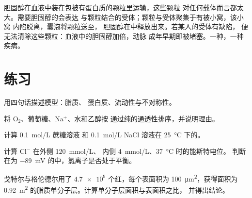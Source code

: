 \begin{example}[胆固醇的运送]\label{ex:b1:membranes-transport:ldl}
胆固醇在血液中装在包被有蛋白质的颗粒里运输，这些颗粒
对任何载体而言都太大。需要胆固醇的会表达
与颗粒结合的受体；颗粒与受体聚集于有被小窝，该小窝
内陷脱离，囊泡将颗粒送至，
胆固醇在中释放出来。若某人的受体有缺陷，
便无法清除这些颗粒：血液中的胆固醇加倍，动脉
成年早期即被堵塞。一种，一种疾病。
\end{example}

\section{练习}

\begin{exercise}[$\star$]\label{exo:b1:membranes-transport:1}
用四句话描述模型：脂质、
蛋白质、流动性与不对称性。
\end{exercise}

\begin{exercise}[$\star$]\label{exo:b1:membranes-transport:2}
将 $\mathrm{O_2}$、葡萄糖、$\mathrm{Na^+}$、水和乙醇按
通过纯的通透性排序，并说明理由。
\end{exercise}

\begin{exercise}[$\star$]\label{exo:b1:membranes-transport:3}
计算 \qty{0.1}{mol/L} 蔗糖溶液
和 \qty{0.1}{mol/L} NaCl 溶液在 \qty{25}{\celsius} 下的。
\end{exercise}

\begin{exercise}[$\star$]\label{exo:b1:membranes-transport:4}
计算 $\mathrm{Cl^-}$ 在外侧 \qty{120}{mmol/L}、
内侧 \qty{4}{mmol/L}、\qty{37}{\celsius} 时的能斯特电位。
判断在为 \qty{-89}{mV} 的中，氯离子是否处于平衡。
\end{exercise}

\begin{exercise}[$\star\star$]\label{exo:b1:membranes-transport:5}
戈特尔与格伦德尔用了 $\num{4.7e9}$ 个红，每个表面积为
\qty{100}{\micro m^2}，获得面积为
\qty{0.92}{m^2} 的脂质单分子层。计算单分子层面积与表面积之比，
并得出结论。
\end{exercise}

